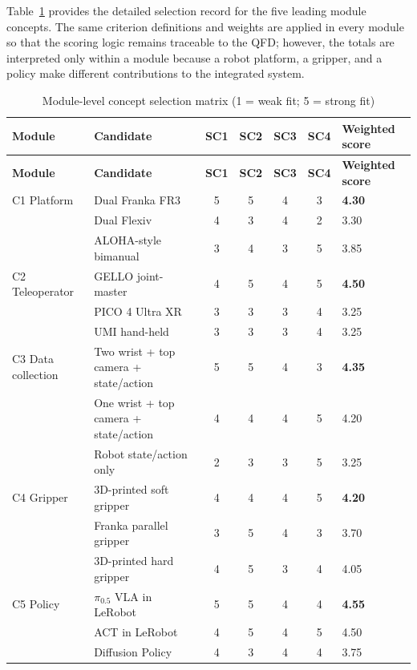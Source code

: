 Table~\ref{tab:module-selection-matrix} provides the detailed selection record for the five leading module concepts. The same criterion definitions and weights are applied in every module so that the scoring logic remains traceable to the QFD; however, the totals are interpreted only within a module because a robot platform, a gripper, and a policy make different contributions to the integrated system.

\begin{longtable}{p{}p{}ccccp{}}
\caption{Module-level concept selection matrix (1 = weak fit; 5 = strong fit)}\label{tab:module-selection-matrix}\\
\toprule
\textbf{Module} & \textbf{Candidate} & \textbf{SC1} & \textbf{SC2} & \textbf{SC3} & \textbf{SC4} & \textbf{Weighted score} \\
\midrule
\endfirsthead
\toprule
\textbf{Module} & \textbf{Candidate} & \textbf{SC1} & \textbf{SC2} & \textbf{SC3} & \textbf{SC4} & \textbf{Weighted score} \\
\midrule
\endhead
C1 Platform & Dual Franka FR3 & 5 & 5 & 4 & 3 & \textbf{4.30} \\
 & Dual Flexiv & 4 & 3 & 4 & 2 & 3.30 \\
 & ALOHA-style bimanual & 3 & 4 & 3 & 5 & 3.85 \\
\midrule
C2 Teleoperator & GELLO joint-master & 4 & 5 & 4 & 5 & \textbf{4.50} \\
 & PICO 4 Ultra XR & 3 & 3 & 3 & 4 & 3.25 \\
 & UMI hand-held & 3 & 3 & 3 & 4 & 3.25 \\
\midrule
C3 Data collection & Two wrist + top camera + state/action & 5 & 5 & 4 & 3 & \textbf{4.35} \\
 & One wrist + top camera + state/action & 4 & 4 & 4 & 5 & 4.20 \\
 & Robot state/action only & 2 & 3 & 3 & 5 & 3.25 \\
\midrule
C4 Gripper & 3D-printed soft gripper & 4 & 4 & 4 & 5 & \textbf{4.20} \\
 & Franka parallel gripper & 3 & 5 & 4 & 3 & 3.70 \\
 & 3D-printed hard gripper & 4 & 5 & 3 & 4 & 4.05 \\
\midrule
C5 Policy & $\pi_{0.5}$ VLA in LeRobot & 5 & 5 & 4 & 4 & \textbf{4.55} \\
 & ACT in LeRobot & 4 & 5 & 4 & 5 & 4.50 \\
 & Diffusion Policy & 4 & 3 & 4 & 4 & 3.75 \\
\bottomrule
\end{longtable}

